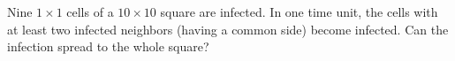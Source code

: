 Nine $1 \times 1$ cells of a $10 \times 10$ square are infected. In one time unit, the cells with at least two infected neighbors (having a common side) become infected. Can the infection spread to the whole square?
